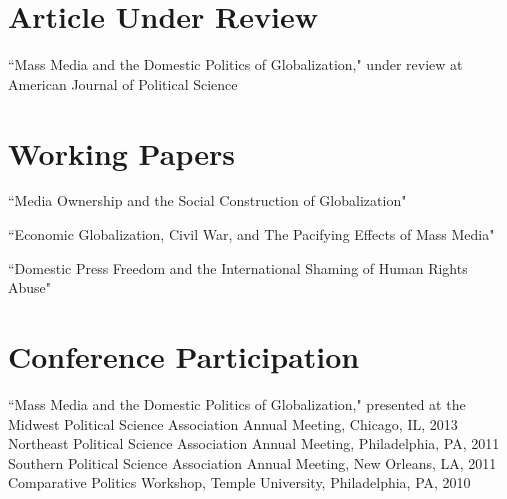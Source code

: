 \documentclass[margin, 12pt]{res} %
\begin{document}
\begin{resume}

\section{Article Under Review} 

``Mass Media and the Domestic Politics of Globalization," under review at American Journal of Political Science


\section{Working Papers} 

``Media Ownership and the Social Construction of Globalization"

``Economic Globalization, Civil War, and The Pacifying Effects of Mass Media" 

``Domestic Press Freedom and the International Shaming of Human Rights Abuse"


\section{Conference Participation} 

``Mass Media and the Domestic Politics of Globalization," presented at the Midwest Political Science Association Annual Meeting, Chicago, IL, 2013 \vspace{3 mm} \\
Northeast Political Science Association Annual Meeting, Philadelphia, PA,  2011  \vspace{3 mm} \\ 
Southern Political Science Association Annual Meeting, New Orleans, LA, 2011 \vspace{3 mm} \\
Comparative Politics Workshop, Temple University, Philadelphia, PA, 2010 \\


\end{resume}
\end{document}
